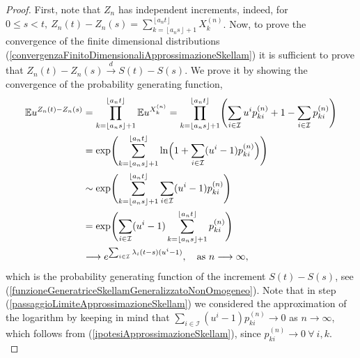 \documentclass[12pt, twoside, english, headsepline]{article}
\newcommand{\floor}[1]{\left\lfloor #1 \right\rfloor}  %
\theoremstyle{definition} %
\numberwithin{equation}{section} %
\begin{document}
\begin{proof}
First, note that $Z_n$ has independent increments, indeed, for $0\le s<t,\ Z_n(t)- Z_n(s)  = \sum_{k=\floor{a_n s}+1}^{\floor{a_n t}} X_{k}^{(n)}$. Now, to prove the convergence of the finite dimensional distributions (\ref{convergenzaFinitoDimensionaliApprossimazioneSkellam}) it is sufficient to prove that $Z_n(t) - Z_n(s) \stackrel{d}{\longrightarrow}S(t)-S(s)$. We prove it by showing the convergence of the probability generating function,
\begin{align}
\mathbb{E} u^{Z_n(t)- Z_n(s)} &= \prod_{k=\floor{a_n s}+1}^{\floor{a_n t}}\mathbb{E}u^{X_k^{(n)}} =  \prod_{k=\floor{a_n s}+1}^{\floor{a_n t}}\Biggl( \sum_{ i\in\mathcal{I} } u^ip_{ki}^{(n)}+ 1- \sum_{ i\in\mathcal{I} } p_{ki}^{(n)}\Biggr) \nonumber\\
&= \exp\Biggl( \sum_{k=\floor{a_n s}+1}^{\floor{a_n t}} \ln\Bigl( 1+ \sum_{ i\in\mathcal{I} } (u^i-1) p_{ki}^{(n)} \Bigr) \Biggr) \nonumber\\
& \sim \exp\Biggl( \sum_{k=\floor{a_n s}+1}^{\floor{a_n t}}  \sum_{ i\in\mathcal{I} } (u^i-1) p_{ki}^{(n)}  \Biggr) \label{passaggioLimiteApprossimazioneSkellam}\\
& =  \exp\Biggl(   \sum_{ i\in\mathcal{I} } (u^i-1) \sum_{k=\floor{a_n s}+1}^{\floor{a_n t}} p_{ki}^{(n)}  \Biggr) \nonumber\\
&\longrightarrow e^{\sum_{ i\in\mathcal{I} } \lambda_i (t-s) (u^i-1)}, \ \ \ \text{as }n\longrightarrow\infty,
\end{align}
which is the probability generating function of the increment $S(t)-S(s)$, see (\ref{funzioneGeneratriceSkellamGeneralizzatoNonOmogeneo}). Note that in step (\ref{passaggioLimiteApprossimazioneSkellam}) we considered the approximation of the logarithm by keeping in mind that $\sum_{i\in\mathcal{I}} (u^i-1)p_{ki}^{(n)}\longrightarrow0$ as $n\longrightarrow\infty$, which follows from (\ref{ipotesiApprossimazioneSkellam}), since $p_{ki}^{(n)}\longrightarrow0 \ \forall \ i,k$.
\\


\end{proof}
\end{document}
